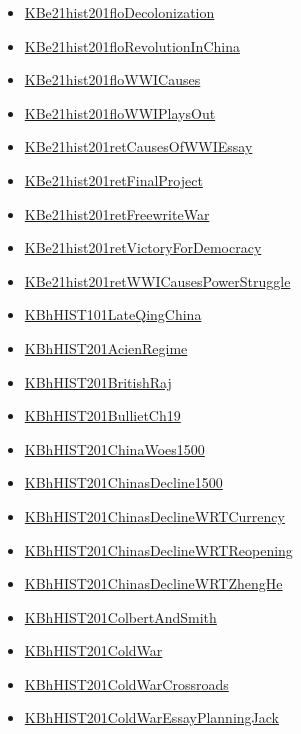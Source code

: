 \documentclass[11pt]{article}
\begin{document}
\begin{itemize}
\begin{itemize}
\item \href{hist201/KBe21hist201floDecolonization.org}{KBe21hist201floDecolonization}
\item \href{hist201/KBe21hist201floRevolutionInChina.org}{KBe21hist201floRevolutionInChina}
\item \href{hist201/KBe21hist201floWWICauses.org}{KBe21hist201floWWICauses}
\item \href{hist201/KBe21hist201floWWIPlaysOut.org}{KBe21hist201floWWIPlaysOut}
\item \href{hist201/KBe21hist201retCausesOfWWIEssay.org}{KBe21hist201retCausesOfWWIEssay}
\item \href{hist201/KBe21hist201retFinalProject.org}{KBe21hist201retFinalProject}
\item \href{hist201/KBe21hist201retFreewriteWar.org}{KBe21hist201retFreewriteWar}
\item \href{hist201/KBe21hist201retVictoryForDemocracy.org}{KBe21hist201retVictoryForDemocracy}
\item \href{hist201/KBe21hist201retWWICausesPowerStruggle.org}{KBe21hist201retWWICausesPowerStruggle}
\item \href{hist201/KBhHIST101LateQingChina.org}{KBhHIST101LateQingChina}
\item \href{hist201/KBhHIST201AcienRegime.org}{KBhHIST201AcienRegime}
\item \href{hist201/KBhHIST201BritishRaj.org}{KBhHIST201BritishRaj}
\item \href{hist201/KBhHIST201BullietCh19.org}{KBhHIST201BullietCh19}
\item \href{hist201/KBhHIST201ChinaWoes1500.org}{KBhHIST201ChinaWoes1500}
\item \href{hist201/KBhHIST201ChinasDecline1500.org}{KBhHIST201ChinasDecline1500}
\item \href{hist201/KBhHIST201ChinasDeclineWRTCurrency.org}{KBhHIST201ChinasDeclineWRTCurrency}
\item \href{hist201/KBhHIST201ChinasDeclineWRTReopening.org}{KBhHIST201ChinasDeclineWRTReopening}
\item \href{hist201/KBhHIST201ChinasDeclineWRTZhengHe.org}{KBhHIST201ChinasDeclineWRTZhengHe}
\item \href{hist201/KBhHIST201ColbertAndSmith.org}{KBhHIST201ColbertAndSmith}
\item \href{hist201/KBhHIST201ColdWar.org}{KBhHIST201ColdWar}
\item \href{hist201/KBhHIST201ColdWarCrossroads.org}{KBhHIST201ColdWarCrossroads}
\item \href{hist201/KBhHIST201ColdWarEssayPlanningJack.org}{KBhHIST201ColdWarEssayPlanningJack}

\end{itemize}
\end{itemize}
\end{document}
